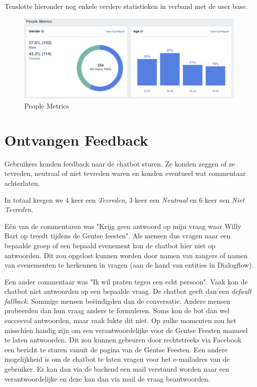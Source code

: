 \documentclass[11pt, letterpaper, oneside]{article}
\begin{document}
	Tenslotte hieronder nog enkele verdere statistieken in verband met de user base.

	\begin{figure}[h]
		\centering
		\includegraphics[width=0.7\linewidth]{./figuren/people-metrics}
		\caption{People Metrics}
		\label{people-metrics}
	\end{figure}

	\clearpage
	
	\section{Ontvangen Feedback}
	
	Gebruikers konden feedback naar de chatbot sturen. Ze konden zeggen of ze tevreden, neutraal of niet tevreden waren en konden eventueel wat commentaar achterlaten.
	
	In totaal kregen we 4 keer een \textit{Tevreden}, 3 keer een \textit{Neutraal} en 6 keer een \textit{Niet Tevreden}.
	
	Eén van de commentaren was "Krijg geen antwoord op mijn vraag waar Willy Bart  op treedt tijdens de Gentse feesten". Als mensen dus vragen naar een bepaalde groep of een bepaald evenement kon de chatbot hier niet op antwoorden. Dit zou opgelost kunnen worden door namen van zangers of namen van evenementen te herkennen in vragen (aan de hand van entities in Dialogflow).
	
	Een ander commentaar was "Ik wil praten tegen een echt persoon". Vaak kon de chatbot niet antwoorden op een bepaalde vraag. De chatbot geeft dan een \textit{default fallback}. Sommige mensen beëindigden dan de conversatie. Andere mensen probeerden dan hun vraag anders te formuleren. Soms kon de bot dan wel succesvol antwoorden, maar vaak lukte dit niet. Op zulke momenten zou het misschien handig zijn om een verantwoordelijke voor de Gentse Feesten manueel te laten antwoorden. Dit zou kunnen gebeuren door rechtstreeks via Facebook een bericht te sturen vanuit de pagina van de Gentse Feesten. Een andere mogelijkheid is om de chatbot te laten vragen voor het e-mailadres van de gebruiker. Er kan dan via de backend een mail verstuurd worden naar een verantwoordelijke en deze kan dan via mail de vraag beantwoorden.
	
\end{document}
